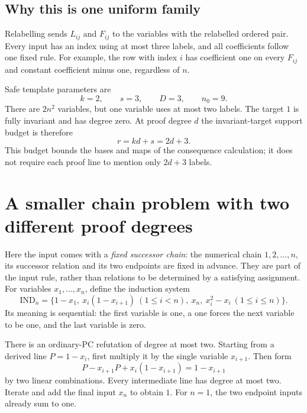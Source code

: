 \subsection{Why this is one uniform family}
Relabelling sends $L_{ij}$ and $F_{ij}$ to the variables with the
relabelled ordered pair. Every input has an index using at most three
labels, and all coefficients follow one fixed rule. For example, the
row with index $i$ has coefficient one on every $F_{ij}$ and constant
coefficient minus one, regardless of $n$.

Safe template parameters are
\begin{equation}\label{tx:eq:order-parameters}
                  k=2,\qquad s=3,\qquad D=3,\qquad n_0=9.
\end{equation}
There are $2n^2$ variables, but one variable uses at most two labels.
The target $1$ is fully invariant and has degree zero. At proof degree
$d$ the invariant-target support budget is therefore
\begin{equation}\label{tx:eq:order-support-budget}
                              r=kd+s=2d+3.
\end{equation}
This budget bounds the bases and maps of the consequence calculation;
it does not require each proof line to mention only $2d+3$ labels.

\section{A smaller chain problem with two different proof degrees}
Here the input comes with a \emph{fixed successor chain}: the numerical
chain $1,2,\ldots,n$, its successor relation and its two endpoints
are fixed in advance. They are part of the input rule, rather than
relations to be determined by a satisfying assignment. For variables
$x_1,\ldots,x_n$, define the induction system
\begin{equation}\label{tx:eq:order-induction}
 \mathrm{IND}_n=\{1-x_1,\ x_i(1-x_{i+1})\ (1\le i<n),\ x_n,
                                      \ x_i^2-x_i\ (1\le i\le n)\}.
\end{equation}
Its meaning is sequential: the first variable is one, a one forces the
next variable to be one, and the last variable is zero.

There is an ordinary-PC refutation of degree at most two. Starting
from a derived line $P=1-x_i$, first multiply it by the single variable
$x_{i+1}$. Then form
\[
       P-x_{i+1}P+x_i(1-x_{i+1})=1-x_{i+1}
\]
by two linear combinations. Every intermediate line has degree at
most two. Iterate and add the final input $x_n$ to obtain $1$.
For $n=1$, the two endpoint inputs already sum to one.

